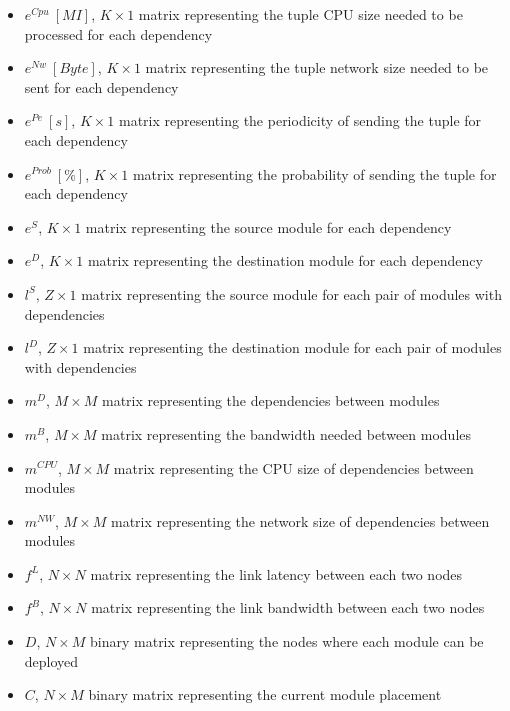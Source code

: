 \documentclass{article}
\begin{document}
\begin{itemize}
	\item $e^{Cpu}~[MI]$, $K\times 1$ matrix representing the tuple CPU size needed to be processed for each dependency
	\item $e^{Nw}~[Byte]$, $K\times 1$ matrix representing the tuple network size needed to be sent for each dependency
	\item $e^{Pe}~[s]$, $K\times 1$ matrix representing the periodicity of sending the tuple for each dependency
	\item $e^{Prob}~[\%]$, $K\times 1$ matrix representing the probability of sending the tuple for each dependency
	\item $e^{S}$, $K\times 1$ matrix representing the source module for each dependency
	\item $e^{D}$, $K\times 1$ matrix representing the destination module for each dependency\\
	
	\item $l^S$, $Z\times 1$ matrix representing the source module for each pair of modules with dependencies
	\item $l^D$, $Z\times 1$ matrix representing the destination module for each pair of modules with dependencies\\
	
	\item $m^D$, $M\times M$ matrix representing the dependencies between modules
	\item $m^B$, $M\times M$ matrix representing the bandwidth needed between modules
	\item $m^{CPU}$, $M\times M$ matrix representing the CPU size of dependencies between modules
	\item $m^{NW}$, $M\times M$ matrix representing the network size of dependencies between modules\\
	
	\item $f^L$, $N\times N$ matrix representing the link latency between each two nodes
	\item $f^B$, $N\times N$ matrix representing the link bandwidth between each two nodes\\
	
	\item $D$, $N\times M$ binary matrix representing the nodes where each module can be deployed
	\item $C$, $N\times M$ binary matrix representing the current module placement\\
	\pagebreak
	

\end{itemize}
\end{document}

